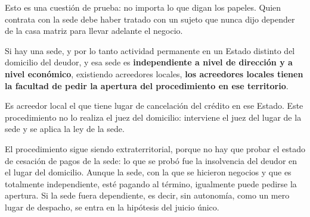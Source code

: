 \documentclass[12pt,oneside]{book}
\begin{document}
Esto es una cuestión de prueba: no importa lo que digan los papeles. Quien contrata con la sede debe haber tratado con un sujeto que nunca dijo depender de la casa matriz para llevar adelante el negocio.

\begin{important}
Si hay una sede, y por lo tanto actividad permanente en un Estado distinto del domicilio del deudor, y esa sede es \textbf{independiente a nivel de dirección y a nivel económico}, existiendo acreedores locales, \textbf{los acreedores locales tienen la facultad de pedir la apertura del procedimiento en ese territorio}.
\end{important}

Es acreedor local el que tiene lugar de cancelación del crédito en ese Estado. Este procedimiento no lo realiza el juez del domicilio: interviene el juez del lugar de la sede y se aplica la ley de la sede.

El procedimiento sigue siendo extraterritorial, porque no hay que probar el estado de cesación de pagos de la sede: lo que se probó fue la insolvencia del deudor en el lugar del domicilio. Aunque la sede, con la que se hicieron negocios y que es totalmente independiente, esté pagando al término, igualmente puede pedirse la apertura. Si la sede fuera dependiente, es decir, sin autonomía, como un mero lugar de despacho, se entra en la hipótesis del juicio único.
\end{document}
